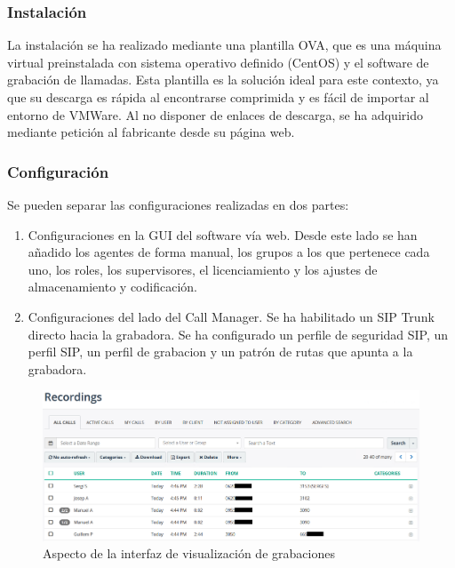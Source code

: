 \documentclass[a4paper, 12pt]{book}
\begin{document}
\subsubsection{Instalación}
\label{sec:instalacion_grabadora}

La instalación se ha realizado mediante una plantilla OVA, que es una máquina virtual preinstalada con sistema operativo definido (CentOS) y el software de grabación de llamadas.
Esta plantilla es la solución ideal para este contexto, ya que su descarga es rápida al encontrarse comprimida y es fácil de importar al entorno de VMWare.
Al no disponer de enlaces de descarga, se ha adquirido mediante petición al fabricante desde su página web.

\subsubsection{Configuración}
\label{sec:configuracion_grabadora}

Se pueden separar las configuraciones realizadas en dos partes:
\begin{enumerate}
  \item Configuraciones en la GUI del software vía web. Desde este lado se han añadido los agentes de forma manual, los grupos a los que pertenece cada uno, los roles, los supervisores, el licenciamiento y los ajustes de almacenamiento y codificación.
  \item Configuraciones del lado del Call Manager. Se ha habilitado un SIP Trunk directo hacia la grabadora. Se ha configurado un perfile de seguridad SIP, un perfil SIP, un perfil de grabacion y un patrón de rutas que apunta a la grabadora.
\end{enumerate}

\begin{figure}
  \centering
  \includegraphics[scale=0.65]{img/fig_grabaciones}
  \caption{Aspecto de la interfaz de visualización de grabaciones}
  \label{figura:fig_grabaciones}
\end{figure}
\end{document}
